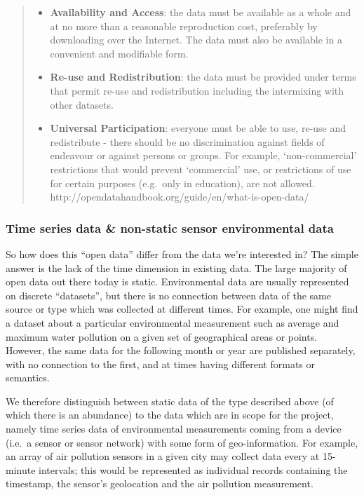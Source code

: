 \begin{quote}
\begin{itemize}
\tightlist
\item
  \textbf{Availability and Access}: the data must be available as a
  whole and at no more than a reasonable reproduction cost, preferably
  by downloading over the Internet. The data must also be available in a
  convenient and modifiable form.
\item
  \textbf{Re-use and Redistribution}: the data must be provided under
  terms that permit re-use and redistribution including the intermixing
  with other datasets.
\item
  \textbf{Universal Participation}: everyone must be able to use, re-use
  and redistribute - there should be no discrimination against fields of
  endeavour or against persons or groups. For example, `non-commercial'
  restrictions that would prevent `commercial' use, or restrictions of
  use for certain purposes (e.g.~only in education), are not allowed.\\
  http://opendatahandbook.org/guide/en/what-is-open-data/
\end{itemize}
\end{quote}

\subsubsection{Time series data \& non-static sensor environmental
data}\label{time-series-data-non-static-sensor-environmental-data}

So how does this ``open data'' differ from the data we're interested in?
The simple answer is the lack of the time dimension in existing data.
The large majority of open data out there today is static. Environmental
data are usually represented on discrete ``datasets'', but there is no
connection between data of the same source or type which was collected
at different times. For example, one might find a dataset about a
particular environmental measurement such as average and maximum water
pollution on a given set of geographical areas or points. However, the
same data for the following month or year are published separately, with
no connection to the first, and at times having different formats or
semantics.

We therefore distinguish between static data of the type described above
(of which there is an abundance) to the data which are in scope for the
project, namely time series data of environmental measurements coming
from a device (i.e.~a sensor or sensor network) with some form of
geo-information. For example, an array of air pollution sensors in a
given city may collect data every at 15-minute intervals; this would be
represented as individual records containing the timestamp, the sensor's
geolocation and the air pollution measurement.

